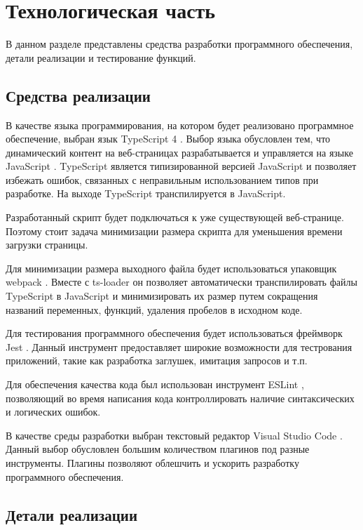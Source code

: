 \chapter{Технологическая часть}

В данном разделе представлены средства разработки программного обеспечения, детали реализации и тестирование функций.

\section{Средства реализации}

В качестве языка программирования, на котором будет реализовано программное обеспечение, выбран язык TypeScript 4 \cite{ts}. Выбор языка обусловлен тем, что динамический контент на веб-страницах разрабатывается и управляется на языке JavaScript \cite{js}. TypeScript является типизированной версией JavaScript и позволяет избежать ошибок, связанных с неправильным использованием типов при разработке. На выходе TypeScript транспилируется в JavaScript.

Разработанный скрипт будет подключаться к уже существующей веб-странице. Поэтому стоит задача минимизации размера скрипта для уменьшения времени загрузки страницы.

Для минимизации размера выходного файла будет использоваться упаковщик webpack \cite{webpack}. Вместе с ts-loader \cite{tsloader} он позволяет автоматически транспилировать файлы TypeScript в JavaScript и минимизировать их размер путем сокращения названий переменных, функций, удаления пробелов в исходном коде.

Для тестирования программного обеспечения будет использоваться фреймворк \cite{framework} Jest \cite{jest}. Данный инструмент предоставляет широкие возможности для тестрования приложений, такие как разработка заглушек, имитация запросов и т.п.

Для обеспечения качества кода был использован инструмент ESLint \cite{eslint}, позволяющий во время написания кода контроллировать наличие синтаксических и логических ошибок.

В качестве среды разработки выбран текстовый редактор Visual Studio Code \cite{vscode}. Данный выбор обусловлен большим количеством плагинов под разные инструменты. Плагины позволяют облешчить и ускорить разработку программного обеспечения.

\section{Детали реализации}

